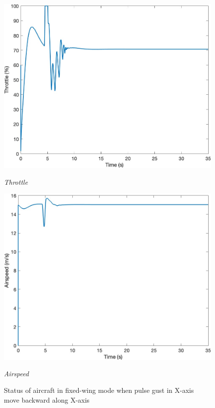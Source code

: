 \begin{figure}[htbp]
\begin{minipage}[b]{0.45\textwidth}
    \centering
    \includegraphics[width=\textwidth]{Images/Gust/Gust FWD pulse 0428/5 Throttle_2.jpg}
    \caption*{\textit{Throttle}}
  \end{minipage}
  \hfil
  \begin{minipage}[b]{0.45\textwidth}
    \centering
    \includegraphics[width=\textwidth]{Images/Gust/Gust FWD pulse 0428/6 Airspeed_2.jpg}
    \caption*{\textit{Airspeed}}
  \end{minipage}
  \caption{Status of aircraft in fixed-wing mode when pulse gust in X-axis move backward along X-axis}
  \label{fig:Gust FWD pulse x}
\end{figure}

